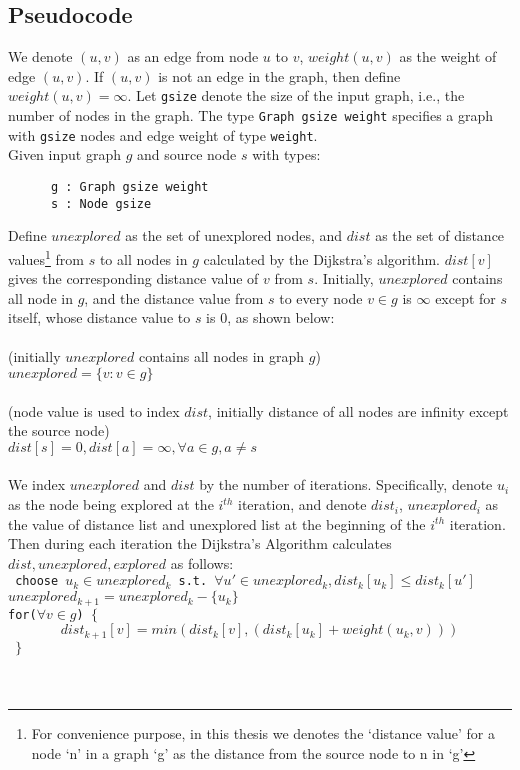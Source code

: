 
\subsection{Pseudocode} \label{pseudo}
We denote $(u, v)$ as an edge from node $u$ to $v$, $weight(u, v)$ as the weight of edge $(u, v)$. If $(u, v)$ is not an edge in the graph, then define $weight(u, v) = \infty$. Let \texttt{gsize} denote the size of the input graph, i.e., the number of nodes in the graph. The type \texttt{Graph gsize weight} specifies a graph with \texttt{gsize} nodes and edge weight of type \texttt{weight}. 
\\
Given input graph $g$ and source node $s$ with types:
\begin{lstlisting}
      g : Graph gsize weight
      s : Node gsize
\end{lstlisting}

Define $unexplored$ as the set of unexplored nodes, and $dist$ as the set of distance values\footnote{For convenience purpose, in this thesis we denotes the `distance value' for a node `n' in a graph `g' as the distance from the source node to n in `g'} from $s$ to all nodes in $g$ calculated by the Dijkstra's algorithm. $dist[v]$ gives the corresponding distance value of $v$ from $s$. Initially, $unexplored$ contains all node in $g$, and the distance value from $s$ to every node $v \in g$ is $\infty$ except for $s$ itself, whose distance value to $s$ is 0, as shown below:  
\\\\
\tab (initially $unexplored$ contains all nodes in graph $g$)\\
\tab $unexplored = \{v : v \in g\}$
\\\\
\tab (node value is used to index $dist$, initially distance of all nodes are infinity except 
\\ \tab the source node)\\
\tab $dist[s] = 0, dist[a] = \infty, \forall a \in g, a \neq s$
\\\\
We index $unexplored$ and $dist$ by the number of iterations. Specifically, denote $u_i$ as the node being explored at the $i^{th}$ iteration, and denote $dist_i$, $unexplored_i$ as the value of distance list and unexplored list at the beginning of the $i^{th}$ iteration. Then during each iteration the Dijkstra's Algorithm calculates $dist, unexplored, explored$ as follows:
\\
\texttt{
  \tab\tab choose $u_k \in unexplored_k$ s.t. $\forall u' \in unexplored_k, dist_k[u_k] \leq dist_k[u']$ \\
  \tab\tab $unexplored_{k+1} = unexplored_k - \{u_k\}$                    \\
  \tab\tab for($\forall v \in g$) $\{$
  \tab\[
  	dist_{k+1}[v] = min(dist_k[v], (dist_k[u_k] + weight(u_k,v)))
  \]    
  \tab\tab $\}$ \\
}
\\\\

